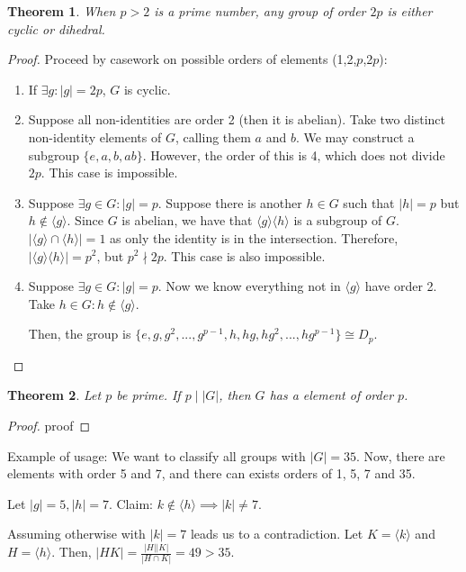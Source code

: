 \documentclass{article}
\theoremstyle{definition}
\theoremstyle{plain}
\newtheorem{theorem}{Theorem}
\theoremstyle{corollary}
\theoremstyle{lemma}
\begin{document}
\begin{theorem}
When $p>2$ is a prime number, any group of order $2p$ is either cyclic or dihedral.
\end{theorem}

\begin{proof}
Proceed by casework on possible orders of elements (1,2,$p$,2$p$):
\begin{enumerate}
    \item If $\exists g:|g|=2p$, $G$ is cyclic.
    \item Suppose all non-identities are order 2 (then it is abelian). Take two distinct non-identity elements of $G$, calling them $a$ and $b$. We may construct a subgroup $\{e,a,b,ab\}$. However, the order of this is 4, which does not divide $2p$. This case is impossible.
    \item Suppose $\exists g\in G:|g|=p$. Suppose there is another $h\in G$ such that $|h|=p$ but $h\notin \langle g\rangle$. Since $G$ is abelian, we have that $\langle g\rangle\langle h\rangle$ is a subgroup of $G$. $|\langle g\rangle\cap\langle h\rangle|=1$ as only the identity is in the intersection. Therefore, $|\langle g\rangle\langle h\rangle|=p^2$, but $p^2\nmid 2p$. This case is also impossible.
    \item Suppose $\exists g\in G:|g|=p$. Now we know everything not in $\langle g\rangle$ have order 2. Take $h\in G:h\notin \langle g\rangle$. 
    
    Then, the group is $\{e,g,g^2,...,g^{p-1},h,hg,hg^2,...,hg^{p-1}\}\cong D_p$.
\end{enumerate}
\end{proof}

\begin{theorem}
Let $p$ be prime. If $p\mid|G|$, then $G$ has a element of order $p$.
\end{theorem}

\begin{proof}
    proof
\end{proof}

Example of usage:
We want to classify all groups with $|G|=35$. Now, there are elements with order 5 and 7, and there can exists orders of 1, 5, 7 and 35.

Let $|g|=5,|h|=7$. Claim: $k\notin\langle h\rangle\implies|k|\neq7$.

Assuming otherwise with $|k|=7$ leads us to a contradiction. Let $K=\langle k\rangle$ and $H=\langle h\rangle$. Then, $|HK|=\frac{|H||K|}{|H\cap K|}=49>35$.
\end{document}
